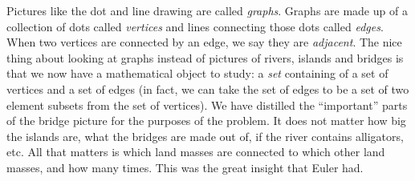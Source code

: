 \documentclass[10pt,]{book}
\theoremstyle{plain}
\theoremstyle{definition}
\theoremstyle{definition}
\theoremstyle{definition}
\numberwithin{equation}{chapter}
\begin{document}
Pictures like the dot and line drawing are called \emph{graphs}.
Graphs are made up of a collection of dots called \emph{vertices} and lines connecting those dots called \emph{edges}. When two vertices are connected by an edge, we say they are \emph{adjacent}. The nice thing about looking at graphs instead of pictures of rivers, islands and bridges is that we now have a mathematical object to study: a \emph{set} containing of a set of vertices and a set of edges (in fact, we can take the set of edges to be a set of two element subsets from the set of vertices). We have distilled the ``important'' parts of the bridge picture for the purposes of the problem. It does not matter how big the islands are, what the bridges are made out of, if the river contains alligators, etc. All that matters is which land masses are connected to which other land masses, and how many times. This was the great insight that Euler had.
%
\par
\end{document}
